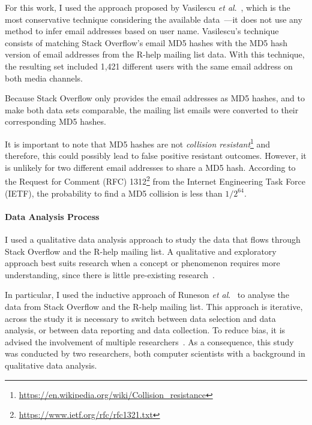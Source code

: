 \documentclass{sig-alternate-05-2015}
\begin{document}
	For this work, I used the approach proposed by Vasilescu \textit{et al}.~\cite{Vasilescu2014c}, which is the most conservative technique considering the available data~\cite{Vasilescu2014b}---it does not use any method to infer email addresses based on user name.
	Vasilescu's technique consists of matching Stack Overflow's email MD5 hashes with the MD5 hash version of email addresses from the R-help mailing list data.
	With this technique, the resulting set included 1,421 different users with the same email address on both media channels.

	Because Stack Overflow only provides the email addresses as MD5 hashes, and to make both data sets comparable, the mailing list emails were converted to their corresponding MD5 hashes.

	It is important to note that MD5 hashes are not \textit{collision resistant}\footnote{\url{https://en.wikipedia.org/wiki/Collision_resistance}} and therefore, this could possibly lead to false positive resistant outcomes. 
	However, it is unlikely for two different email addresses to share a MD5 hash.
	According to the Request for Comment (RFC) 1312\footnote{\url{https://www.ietf.org/rfc/rfc1321.txt}} from the Internet Engineering Task Force (IETF), the probability to find a MD5 collision is less than $1/2^{64}$.

\paragraph{Data Analysis Process}
\label{sec:dap}

	I used a qualitative data analysis approach to study the data that flows through Stack Overflow and the R-help mailing list.
    A qualitative and exploratory approach best suits research when a concept or phenomenon requires more understanding, since there is little pre-existing research~\cite{Creswell2009}.

	In particular, I used the inductive approach of Runeson \textit{et al}.~\cite{Runeson2012} to analyse the data from Stack Overflow and the R-help mailing list.
	This approach is iterative, across the study it is necessary to switch between data selection and data analysis, or between data reporting and data collection.
	To reduce bias, it is advised the involvement of multiple researchers~\cite{Runeson2012}.
	As a consequence, this study was conducted by two researchers, both computer scientists with a background in qualitative data analysis.
\end{document}
